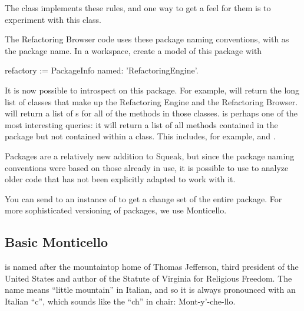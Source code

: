 \documentclass[a4paper,10pt,twoside]{book}
\begin{document}
The class  implements these rules, and one way to get a feel for them is to experiment with this class.

The Refactoring Browser code uses these package naming conventions, with  as the package name. In a workspace, create a model of this package with

\begin{code}{}
refactory := PackageInfo named: 'RefactoringEngine'. 
\end{code}

It is now possible to introspect on this package. 
For example,  will return the long list of classes that make up the Refactoring Engine and the Refactoring Browser.  
will return a list of s for all of the methods in those classes.  is perhaps one of the most interesting queries: it will return a list of all methods contained in the  package but not contained within a  class. This includes, for example,  and .

Packages are a relatively new addition to Squeak, but since the package naming conventions were based on those already in use, it is possible to use  to analyze older code that has not been explicitly adapted to work with it.


You can send  to an instance of  to get a change set of the
entire package.  For more sophisticated versioning of packages, we use Monticello.

\subsection{Basic Monticello}

 is named after the mountaintop home of Thomas Jefferson, third president of the United States and author of the Statute of Virginia for Religious Freedom.  The name means ``little mountain'' in Italian, and so it is always pronounced with an Italian ``c'', which sounds like the ``ch'' in chair: Mont-y'-che-llo.
\end{document}
